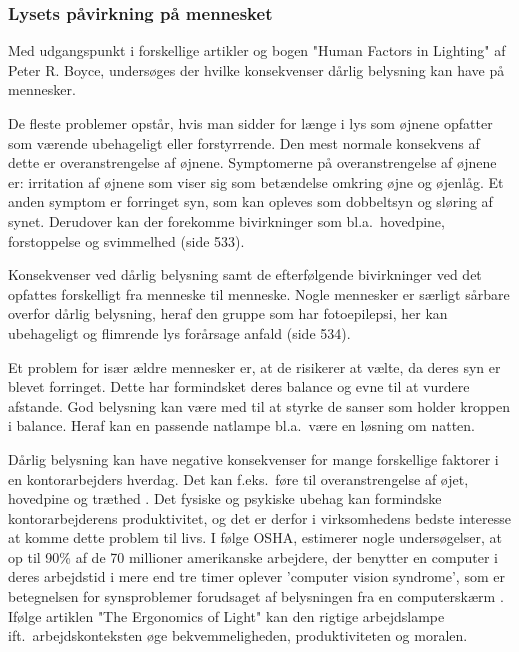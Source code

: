 \subsubsection{Lysets påvirkning på mennesket} 
\label{sec:konsekvenser}

Med udgangspunkt i forskellige artikler og bogen "Human Factors in Lighting" af Peter R. Boyce, undersøges der hvilke konsekvenser dårlig belysning kan have på mennesker. 

De fleste problemer opstår, hvis man sidder for længe i lys som øjnene opfatter som værende ubehageligt eller forstyrrende. Den mest normale konsekvens af dette er overanstrengelse af øjnene. Symptomerne på overanstrengelse af øjnene er: irritation af øjnene som viser sig som betændelse omkring øjne og øjenlåg. Et anden symptom er forringet syn, som kan opleves som dobbeltsyn og sløring af synet. Derudover kan der forekomme bivirkninger som bl.a.\ hovedpine, forstoppelse og svimmelhed \cite{human_factors}(side 533).

Konsekvenser ved dårlig belysning samt de efterfølgende bivirkninger ved det opfattes forskelligt fra menneske til menneske. Nogle mennesker er særligt sårbare overfor dårlig belysning, heraf den gruppe som har fotoepilepsi, her kan ubehageligt og flimrende lys forårsage anfald \cite{human_factors}(side 534). 

Et problem for især ældre mennesker er, at de risikerer at vælte, da deres syn er blevet forringet. Dette har formindsket deres balance og evne til at vurdere afstande. God belysning kan være med til at styrke de sanser som holder kroppen i balance. Heraf kan en passende natlampe bl.a.\ være en løsning om natten\cite{human_factors}. 

Dårlig belysning kan have negative konsekvenser for mange forskellige faktorer i en kontorarbejders hverdag. Det kan f.eks.\ føre til overanstrengelse af øjet, hovedpine og træthed \cite{ergonomi_arbejdsplads}. Det fysiske og psykiske ubehag kan formindske kontorarbejderens produktivitet, og det er derfor i virksomhedens bedste interesse at komme dette problem til livs. I følge OSHA, estimerer nogle undersøgelser, at op til 90\% af de 70 millioner amerikanske arbejdere, der benytter en computer i deres arbejdstid i mere end tre timer oplever 'computer vision syndrome', som er betegnelsen for synsproblemer forudsaget af belysningen fra en computerskærm \cite{CVS}. Ifølge artiklen "The Ergonomics of Light" kan den rigtige arbejdslampe ift.\ arbejdskonteksten øge bekvemmeligheden, produktiviteten og moralen\cite{ergonomi_arbejdsplads}. 